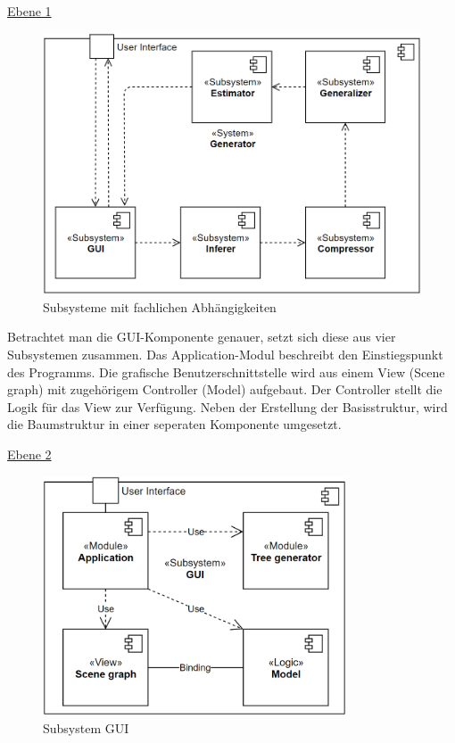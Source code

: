 \underline{Ebene 1}
\begin{figure}[H]
    \centering
    \includegraphics[width=12cm]{../images/Bausteinsicht_Ebene_1.PNG}
    \caption{Subsysteme mit fachlichen Abhängigkeiten}
\end{figure}

\newpage

Betrachtet man die GUI-Komponente genauer, setzt sich diese aus vier Subsystemen zusammen.
Das Application-Modul beschreibt den Einstiegspunkt des Programms.
Die grafische Benutzerschnittstelle wird aus einem View (Scene graph) mit zugehörigem Controller (Model)
aufgebaut.
Der Controller stellt die Logik für das View zur Verfügung.
Neben der Erstellung der Basisstruktur, wird die Baumstruktur in einer seperaten Komponente umgesetzt.

\underline{Ebene 2}
\begin{figure}[H]
    \centering
    \includegraphics[width=9cm]{../images/Bausteinsicht_Ebene_2.PNG}
    \caption{Subsystem GUI}
\end{figure}

\newpage

